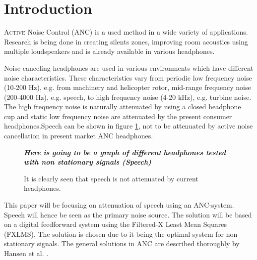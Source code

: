 \section*{Introduction}
\lettrine[lines=2]{A}{ctive} Noise Control (ANC) is a used method in a wide variety of applications. Research is being done in creating silents zones\cite{SilentZones}, improving room acoustics using multiple loudspeakers\cite{CAPS} and is already available in various headphones.

Noise canceling headphones are used in various environments which have different noise characteristics. These characteristics vary from periodic low frequency noise (10-200 Hz), e.g. from machinery and helicopter rotor\cite{LowFrequency}, mid-range frequency noise (200-4000 Hz), e.g. speech\cite{MidFrequency}, to high frequency noise (4-20 kHz), e.g. turbine noise\cite{LowFrequency}. The high frequency noise is naturally attenuated by using a closed headphone cup\cite{naturalAttenuation} and static low frequency noise are attenuated by the present consumer headphones\cite{naturalAttenuation}.Speech can be shown in figure \ref{fig:ANCcompare}, not to be attenuated by active noise cancellation in present market ANC headphones.

\begin{figure}[H]
	\centering
	\textbf{\textit{Here is going to be a graph of different}}
	\textbf{\textit{ headphones tested with non stationary signals (Speech)}}
	\caption{It is clearly seen that speech is not attenuated by current headphones.}
	\label{fig:ANCcompare}
\end{figure}


This paper will be focusing on attenuation of speech using an ANC-system. Speech will hence be seen as the primary noise source. The solution will be based on a digital feedforward system using the Filtered-X Least Mean Squares (FXLMS). The solution is chosen due to it being the optimal system for non stationary signals\cite{Hansen2}. The general solutions in ANC are described thoroughly by Hansen et al. \cite{Hansen}.

